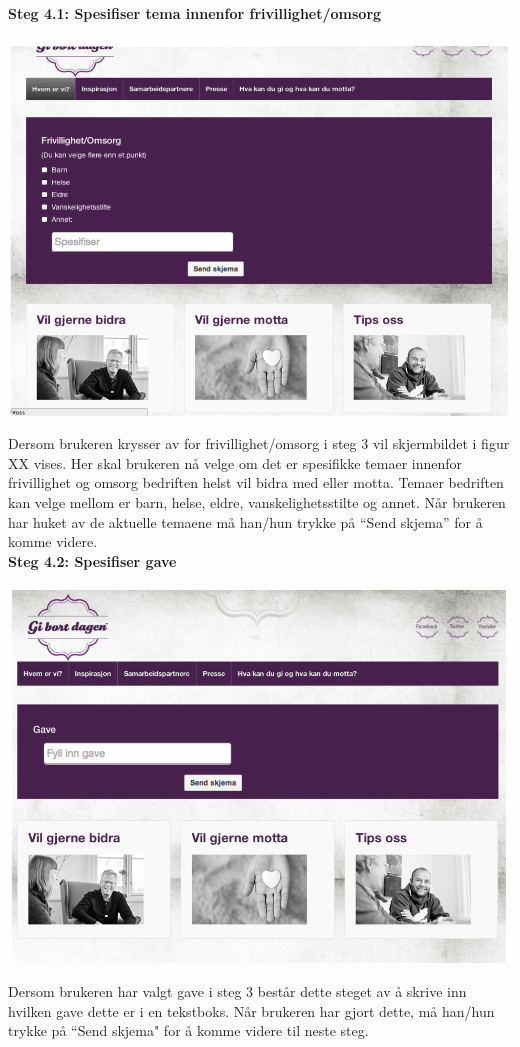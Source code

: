 \bf{Steg 4.1:} Spesifiser tema innenfor frivillighet/omsorg
\begin{center}
\includegraphics[clip=true, width=1 \textwidth,
trim=0cm 0cm 0cm 0cm]{spesifisertema.png}
\label{fig:spesifisertema}
\end{center}

Dersom brukeren krysser av for frivillighet/omsorg i steg 3 vil skjermbildet i figur XX vises. Her skal brukeren nå velge om det er spesifikke temaer innenfor frivillighet og omsorg bedriften helst vil bidra med eller motta. Temaer bedriften kan velge mellom er barn, helse, eldre, vanskelighetsstilte og annet. Når brukeren har huket av de aktuelle temaene må han/hun trykke på “Send skjema” for å komme videre.\\

\bf{Steg 4.2:} Spesifiser gave
\begin{center}
\includegraphics[clip=true, width=1 \textwidth,
trim=0cm 0cm 0cm 0cm]{gave.png}
\label{fig:gave}
\end{center}
Dersom brukeren har valgt gave i steg 3 består dette steget av å skrive inn hvilken gave dette er i en tekstboks. Når brukeren har gjort dette, må han/hun trykke på ``Send skjema" for å komme videre til neste steg.\\


